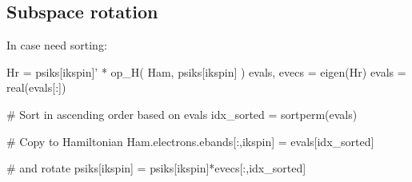 \subsection*{Subspace rotation}

In case need sorting:

\begin{juliacode}
Hr = psiks[ikspin]' * op_H( Ham, psiks[ikspin] )
evals, evecs = eigen(Hr)
evals = real(evals[:])

# Sort in ascending order based on evals 
idx_sorted = sortperm(evals)

# Copy to Hamiltonian
Ham.electrons.ebands[:,ikspin] = evals[idx_sorted]

# and rotate
psiks[ikspin] = psiks[ikspin]*evecs[:,idx_sorted]
\end{juliacode}


